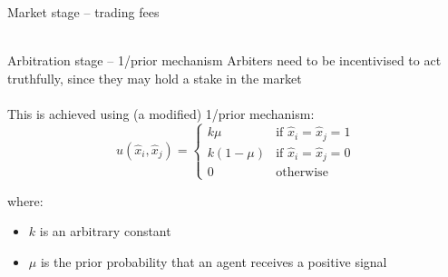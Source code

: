 \documentclass[9pt]{beamer}
\begin{document}
\begin{frame}{Market stage -- trading fees}
    ~\\
    
    ~\\
    
\end{frame}

\begin{frame}{Arbitration stage -- 1/prior mechanism}
    Arbiters need to be incentivised to act truthfully, since they may hold a stake in the market \\~\\
    
    This is achieved using (a modified) 1/prior mechanism:
    \begin{equation}
        u(\hat{x}_i, \hat{x}_j) = \begin{cases}
        k \mu & \text{if } \hat{x}_i = \hat{x}_j = 1 \\
        k(1 - \mu) & \text{if } \hat{x}_i = \hat{x}_j = 0 \\
        0 & \text{otherwise}
        \end{cases}
    \end{equation}
    
    where:
    \begin{itemize}
        \item $k$ is an arbitrary constant
        \item $\mu$ is the prior probability that an agent receives a positive signal
    \end{itemize}
\end{frame}
\end{document}
